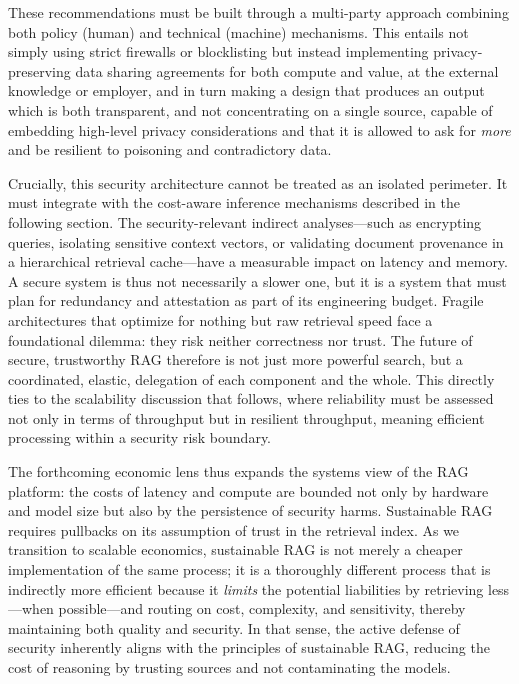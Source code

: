 \documentclass[11pt]{article}
\begin{document}
These recommendations must be built through a multi-party approach combining both policy (human) and technical (machine) mechanisms. This entails not simply using strict firewalls or blocklisting but instead implementing privacy-preserving data sharing agreements for both compute and value, at the external knowledge or employer, and in turn making a design that produces an output which is both transparent, and not concentrating on a single source, capable of embedding high-level privacy considerations and that it is allowed to ask for \emph{more} and be resilient to poisoning and contradictory data.

Crucially, this security architecture cannot be treated as an isolated perimeter. It must integrate with the cost-aware inference mechanisms described in the following section. The security-relevant indirect analyses---such as encrypting queries, isolating sensitive context vectors, or validating document provenance in a hierarchical retrieval cache---have a measurable impact on latency and memory. A secure system is thus not necessarily a slower one, but it is a system that must plan for redundancy and attestation as part of its engineering budget. Fragile architectures that optimize for nothing but raw retrieval speed face a foundational dilemma: they risk neither correctness nor trust. The future of secure, trustworthy RAG therefore is not just more powerful search, but a coordinated, elastic, delegation of each component and the whole. This directly ties to the scalability discussion that follows, where reliability must be assessed not only in terms of throughput but in resilient throughput, meaning efficient processing within a security risk boundary.

The forthcoming economic lens thus expands the systems view of the RAG platform: the costs of latency and compute are bounded not only by hardware and model size but also by the persistence of security harms. Sustainable RAG requires pullbacks on its assumption of trust in the retrieval index. As we transition to scalable economics, sustainable RAG is not merely a cheaper implementation of the same process; it is a thoroughly different process that is indirectly more efficient because it \emph{limits} the potential liabilities by retrieving less---when possible---and routing on cost, complexity, and sensitivity, thereby maintaining both quality and security. In that sense, the active defense of security inherently aligns with the principles of sustainable RAG, reducing the cost of reasoning by trusting sources and not contaminating the models.
\end{document}
